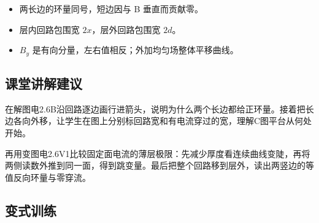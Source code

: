 \documentclass[UTF8,fontset=fandol,a4paper,11pt]{ctexart}
\begin{document}
\begin{itemize}
\item 两长边的环量同号，短边因与 B 垂直而贡献零。
\item 层内回路包围宽 $2x$，层外回路包围宽 $2d$。
\item $B_y$ 是有向分量，左右值相反；外加均匀场整体平移曲线。
\end{itemize}



\subsection*{课堂讲解建议}

在解图电2.6B沿回路逐边画行进箭头，说明为什么两个长边都给正环量。接着把长边各向外移，让学生在图上分别标回路宽和有电流穿过的宽，理解C图平台从何处开始。

再用变图电2.6V1比较固定面电流的薄层极限：先减少厚度看连续曲线变陡，再将两侧读数外推到同一面，得到跳变量。最后把整个回路移到层外，读出两竖边的等值反向环量与零穿流。


\subsection*{变式训练}
\end{document}
